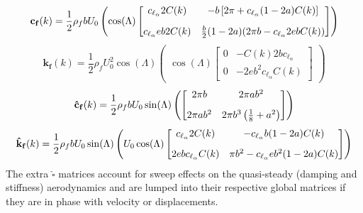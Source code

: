 \documentclass[10pt]{article}
\newcommand{\mbf}[1]{\mathbf{#1}}
\newcommand{\be}{\begin{eqnarray}}
\newcommand{\ee}{\end{eqnarray}}
\begin{document}
\begin{equation}
	\label{eqn:FluidDamp}
	\mbf{c_f}(k) =
	\frac{1}{2}\rho_f b U_0
	\left(
	\begin{aligned}
			\cos(\Lambda)
			\begin{bmatrix}
				\vspace{3mm}c_{\ell_{\alpha}} 2 C(k) & -b \left[2 \pi + c_{\ell_{\alpha}} (1-2a) C (k)\right]     \\
				c_{\ell_{\alpha}} eb 2C(k)           & \frac{b}{2} (1-2a)(2 \pi b - c_{\ell_{\alpha}} 2 eb C (k))
			\end{bmatrix}
		\end{aligned}
	\right)
\end{equation}
%
\begin{equation}
	\label{eqn:FluidStiff}
	\mbf{k_f}(k) = \frac{1}{2}\rho_f U_0^2 \cos(\Lambda)
	\left(
	\begin{aligned}
			\cos(\Lambda)
			\begin{bmatrix}
				0 & -C(k)2b c_{\ell_{\alpha}}     \\
				0 & -2eb^2 c_{\ell_{\alpha}} C(k)
			\end{bmatrix}
		\end{aligned}
	\right)
\end{equation}
%
\be
\label{eqn:FluidSweep}
\mbf{\hat{c}_f}(k) =
\frac{1}{2}\rho_f b U_0
\sin(\Lambda)
\left(
\begin{aligned}
		\begin{bmatrix}
			\vspace{3mm}2 \pi b & 2 \pi ab^2                           \\
			2\pi ab^2           & 2\pi b^3\left(\frac{1}{8}+a^2\right)
		\end{bmatrix}
	\end{aligned}
\right)
\ee
%
\begin{eqnarray}
	\mbf{\hat{k}_f}(k) =
	\frac{1}{2}\rho_f b U_0
	\sin(\Lambda)
	\left(
	\begin{aligned}
			U_0 \cos(\Lambda)
			\begin{bmatrix}
				\vspace{3mm} c_{\ell_{\alpha}}2 C (k) & - c_{\ell_{\alpha}} b (1-2a)C(k)          \\
				2ebc_{\ell_{\alpha}} C (k)            & \pi b^2  -c_{\ell_{\alpha}}eb^2(1-2a)C(k)
			\end{bmatrix}
		\end{aligned}
	\right)
\end{eqnarray}
% 
The extra $\hat{\square}$ matrices account for sweep effects on the quasi-steady (damping and stiffness) aerodynamics and are lumped into their respective global matrices if they are in phase with velocity or displacements.
\end{document}
